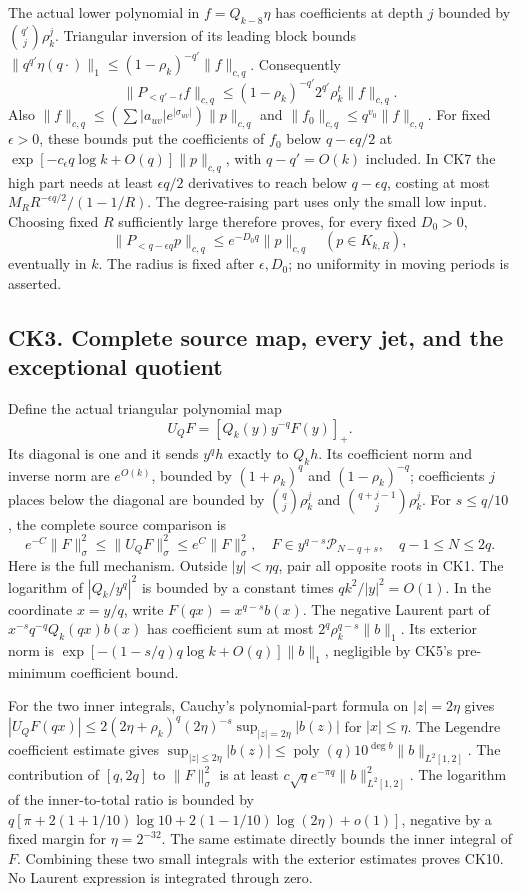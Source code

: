 \documentclass[10pt]{article}
\begin{document}
The actual lower polynomial in \(f=Q_{k-8}\eta\) has coefficients at depth \(j\) bounded by \(\binom{q'}j\rho_k^j\). Triangular inversion of its leading block bounds \(\|q^{q'}\eta(q\cdot)\|_1\le(1-\rho_k)^{-q'}\|f\|_{c,q}\). Consequently \[
 \|P_{<q'-t}f\|_{c,q}\le(1-\rho_k)^{-q'}2^{q'}\rho_k^t\|f\|_{c,q}.
\] Also \(\|f\|_{c,q}\le(\sum|a_{uv}|e^{|\sigma_{uv}|})\|p\|_{c,q}\) and \(\|f_0\|_{c,q}\le q^{v_0}\|f\|_{c,q}\). For fixed \(\epsilon>0\), these bounds put the coefficients of \(f_0\) below \(q-\epsilon q/2\) at \(\exp[-c_\epsilon q\log k+O(q)]\|p\|_{c,q}\), with \(q-q'=O(k)\) included. In CK7 the high part needs at least \(\epsilon q/2\) derivatives to reach below \(q-\epsilon q\), costing at most \(M_RR^{-\epsilon q/2}/(1-1/R)\). The degree-raising part uses only the small low input. Choosing fixed \(R\) sufficiently large therefore proves, for every fixed \(D_0>0\), \[
 \|P_{<q-\epsilon q}p\|_{c,q}\le e^{-D_0q}\|p\|_{c,q}
 \quad(p\in K_{k,R}),
 \tag{CK8}
\] eventually in \(k\). The radius is fixed after \(\epsilon,D_0\); no uniformity in moving periods is asserted.

\subsection{CK3. Complete source map, every jet, and the exceptional quotient}\label{ck3.-complete-source-map-every-jet-and-the-exceptional-quotient}

Define the actual triangular polynomial map \[
 U_QF=[Q_k(y)y^{-q}F(y)]_+.
 \tag{CK9}
\] Its diagonal is one and it sends \(y^qh\) exactly to \(Q_kh\). Its coefficient norm and inverse norm are \(e^{O(k)}\), bounded by \((1+\rho_k)^q\) and \((1-\rho_k)^{-q}\); coefficients \(j\) places below the diagonal are bounded by \(\binom qj\rho_k^j\) and \(\binom{q+j-1}j\rho_k^j\). For \(s\le q/10\), the complete source comparison is \[
 e^{-C}\|F\|_\sigma^2\le\|U_QF\|_\sigma^2\le e^C\|F\|_\sigma^2,
 \quad F\in y^{q-s}\mathcal P_{N-q+s},\quad q-1\le N\le2q.
 \tag{CK10}
\] Here is the full mechanism. Outside \(|y|<\eta q\), pair all opposite roots in CK1. The logarithm of \(|Q_k/y^q|^2\) is bounded by a constant times \(qk^2/|y|^2=O(1)\). In the coordinate \(x=y/q\), write \(F(qx)=x^{q-s}b(x)\). The negative Laurent part of \(x^{-s}q^{-q}Q_k(qx)b(x)\) has coefficient sum at most \(2^q\rho_k^{q-s}\|b\|_1\). Its exterior norm is \(\exp[-(1-s/q)q\log k+O(q)]\|b\|_1\), negligible by CK5's pre-minimum coefficient bound.

For the two inner integrals, Cauchy's polynomial-part formula on \(|z|=2\eta\) gives \(|U_QF(qx)|\le2(2\eta+\rho_k)^q(2\eta)^{-s}\sup_{|z|=2\eta}|b(z)|\) for \(|x|\le\eta\). The Legendre coefficient estimate gives \(\sup_{|z|\le2\eta}|b(z)|\le\operatorname{poly}(q)10^{\deg b}\|b\|_{L^2[1,2]}\). The contribution of \([q,2q]\) to \(\|F\|_\sigma^2\) is at least \(c\sqrt q e^{-\pi q}\|b\|_{L^2[1,2]}^2\). The logarithm of the inner-to-total ratio is bounded by \(q[\pi+2(1+1/10)\log10+2(1-1/10)\log(2\eta)+o(1)]\), negative by a fixed margin for \(\eta=2^{-32}\). The same estimate directly bounds the inner integral of \(F\). Combining these two small integrals with the exterior estimates proves CK10. No Laurent expression is integrated through zero.
\end{document}
